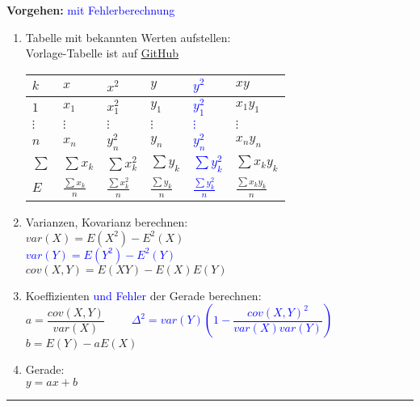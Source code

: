\begin{minipage}[t]{10cm}
  \textbf{Vorgehen:}
  \textcolor{blue}{mit Fehlerberechnung}
	\begin{enumerate}
		\item Tabelle mit bekannten Werten aufstellen:\\
		\scriptsize
		Vorlage-Tabelle ist auf \href{https://github.com/HSR-Stud/WrStat/tree/master/Zusatzblaetter/LineareRegression}{GitHub}\\ %
		\normalsize
  		\begin{tabular}{|l||l|l||l|l||l|}
  		  \hline
        \textbf{$k$} & \textbf{$x$} & \textbf{$x^2$} & \textbf{$y$} &
  		  \textcolor{blue}{\textbf{$y^2$}} & \textbf{$xy$} \\
  		  \hline \hline
  		  $1$ & $x_1$ & $x_1^2$ & $y_1$ & \textcolor{blue}{$y_1^2$} & $x_1y_1$ \\
  		  \hline
  		  $\vdots$ & $\vdots$ & $\vdots$ & $\vdots$ & \textcolor{blue}{$\vdots$} &
  		  $\vdots$ \\\hline $n$ & $x_n$ & $y_n^2$ & $y_n$ & \textcolor{blue}{$y_n^2$} & $x_ny_n$ \\
  		  \hline
  		  \hline
  		  $\sum$ & $\sum x_k$ & $\sum x_k^2$ & $\sum y_k$ & \textcolor{blue}{$\sum
  		  y_k^2$} & $\sum x_ky_k$ \\
  		  \hline $E$ & $\frac{\sum x_k}{n}$ & $\frac{\sum x_k^2}{n}$ & $\frac{\sum
  		  y_k}{n}$ & \textcolor{blue}{$\frac{\sum y_k^2}{n}$} & $\frac{\sum x_ky_k}{n}$ \\
  		  \hline
  		\end{tabular} 
		\item Varianzen, Kovarianz berechnen: \\
		  $var(X) = E(X^2) - E^2(X)$ \\
		  \textcolor{blue}{$var(Y) = E(Y^2) - E^2(Y)$} \\
		  $cov(X,Y) = E(XY) - E(X)E(Y)$
		\item Koeffizienten \textcolor{blue}{und Fehler} der Gerade berechnen: \\
		  $a=\dfrac{cov(X,Y)}{var(X)}$
		  \textcolor{blue}{$\qquad\Delta^2=var(Y)\left(1-\dfrac{cov(X,Y)^2}
		  {var(X)var(Y)}\right) $} \\
		  $b=E(Y)-aE(X)$
		\item Gerade: \\
		$y=ax+b$
	\end{enumerate}
\end{minipage}
\vspace{.2cm}
\hrule
